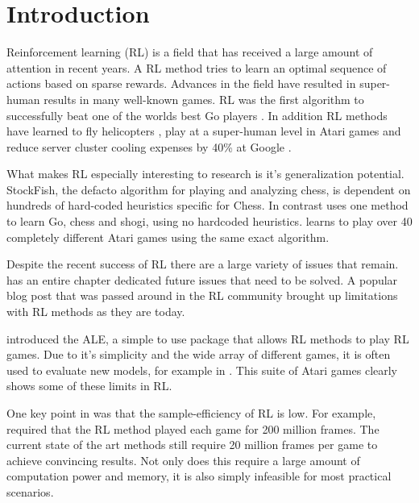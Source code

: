 
\chapter{Introduction}\label{ch:intro}

Reinforcement learning (RL) is a field that has received a large amount of attention in recent years. A RL method tries to learn an optimal sequence of actions based on sparse rewards. Advances in the field have resulted in super-human results in many well-known games. RL was the first algorithm to successfully beat one of the worlds best Go players \citep{silver_2017}. In addition RL methods have learned to fly helicopters \citep{abbeel_2007}, play at a super-human level in Atari games \citep{mnih_2015} and reduce server cluster cooling expenses by 40\% at Google \citep{deepmind}.

What makes RL especially interesting to research is it's generalization potential.  StockFish, the defacto algorithm for playing and analyzing chess, is dependent on hundreds of hard-coded heuristics specific for Chess. In contrast \cite{silver_2017b} uses one method to learn Go, chess and shogi, using no hardcoded heuristics. \cite{mnih_2015} learns to play over 40 completely different Atari games using the same exact algorithm.

Despite the recent success of RL there are a large variety of issues that remain. \cite{sutton_barto_2018} has an entire chapter dedicated future issues that need to be solved. A popular blog post that was passed around in the RL community \citep{blog} brought up limitations with RL methods as they are today. 

\cite{bellemare_2013} introduced the ALE, a simple to use package that allows RL methods to play RL games.  Due to it's simplicity and the wide array of different games, it is often used to evaluate new models, for example in \cite{mnih_2015}. This suite of Atari games clearly shows some of these limits in RL. 

One key point in \cite{blog} was that the sample-efficiency of RL is low. For example, \cite{mnih_2015} required that the RL method played each game for 200 million frames. The current state of the art methods still require 20 million frames per game \citep{hessel_2017} to achieve convincing results. Not only does this require a large amount of computation power and memory, it is also simply infeasible for most practical scenarios.

